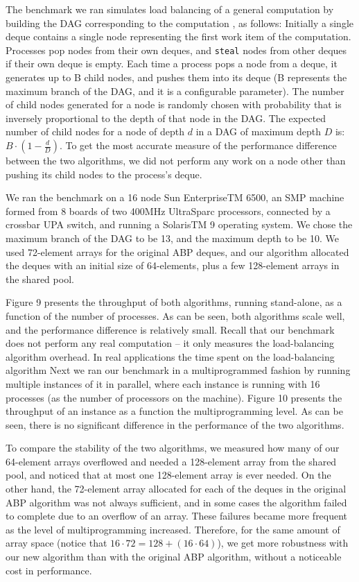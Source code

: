 The benchmark we ran simulates load balancing of a general computation
by building the DAG corresponding to the computation
\cite{Blumofe1999}, as follows: Initially a single deque contains a
single node representing the first work item of the
computation. Processes pop nodes from their own deques, and
\lstinline!steal! nodes from other deques if their own deque is
empty. Each time a process pops a node from a deque, it generates up
to B child nodes, and pushes them into its deque (B represents the
maximum branch of the DAG, and it is a configurable parameter). The
number of child nodes generated for a node is randomly chosen with
probability that is inversely proportional to the depth of that node
in the DAG. The expected number of child nodes for a node of depth $d$
in a DAG of maximum depth $D$ is: $B \cdot \left(1 - \frac{d}{D}
\right)$. To get the most accurate measure of the performance
difference between the two algorithms, we did not perform any work on
a node other than pushing its child nodes to the process's deque.

We ran the benchmark on a 16 node Sun EnterpriseTM 6500, an SMP
machine formed from 8 boards of two 400MHz UltraSparc processors,
connected by a crossbar UPA switch, and running a SolarisTM 9
operating system. We chose the maximum branch of the DAG to be 13, and
the maximum depth to be 10. We used 72-element arrays for the original
ABP deques, and our algorithm allocated the deques with an initial
size of 64-elements, plus a few 128-element arrays in the shared pool.

Figure 9 presents the throughput of both algorithms, running
stand-alone, as a function of the number of processes. As can be
seen, both algorithms scale well, and the performance difference is
relatively small. Recall that our benchmark does not perform any real
computation -- it only measures the load-balancing algorithm
overhead. In real applications the time spent on the load-balancing
algorithm Next we ran our benchmark in a multiprogrammed fashion by
running multiple instances of it in parallel, where each instance is
running with 16 processes (as the number of processors on the
machine). Figure 10 presents the throughput of an instance as a
function the multiprogramming level. As can be seen, there is no
significant difference in the performance of the two algorithms.

To compare the stability of the two algorithms, we measured how many
of our 64-element arrays overflowed and needed a 128-element array
from the shared pool, and noticed that at most one 128-element array
is ever needed. On the other hand, the 72-element array allocated for
each of the deques in the original ABP algorithm was not always
sufficient, and in some cases the algorithm failed to complete due to
an overflow of an array. These failures became more frequent as the
level of multiprogramming increased. Therefore, for the same amount of
array space (notice that $16 \cdot 72 = 128 + (16 \cdot 64)$), we get
more robustness with our new algorithm than with the original ABP
algorithm, without a noticeable cost in performance.

